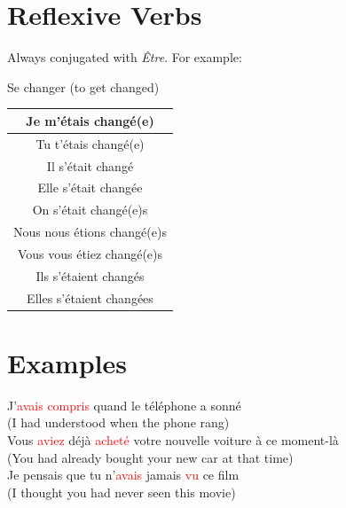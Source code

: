 \documentclass{book}
\begin{document}
    \section{Reflexive Verbs}
        Always conjugated with \textit{Être}. For example:
        \begin{center}
            Se changer (to get changed)
            \begin{tabular}{|c|}
                \hline
                Je m'étais changé(e) \\
                \hline
                Tu t'étais changé(e) \\
                \hline
                Il s'était changé \\
                \hline
                Elle s'était changée \\
                \hline
                On s'était changé(e)s \\
                \hline
                Nous nous étions changé(e)s \\
                \hline
                Vous vous étiez changé(e)s \\
                \hline
                Ils s'étaient changés \\
                \hline
                Elles s'étaient changées \\
                \hline
            \end{tabular}
        \end{center}

    \section{Examples}
        \begin{center}
            J'\textcolor{red}{avais compris} quand le téléphone a sonné \\
            (I had understood when the phone rang) \\
            Vous \textcolor{red}{aviez} déjà \textcolor{red}{acheté} votre nouvelle voiture à ce moment-là \\
            (You had already bought your new car at that time) \\
            Je pensais que tu n'\textcolor{red}{avais} jamais \textcolor{red}{vu} ce film \\
            (I thought you had never seen this movie)
        \end{center}
\end{document}

